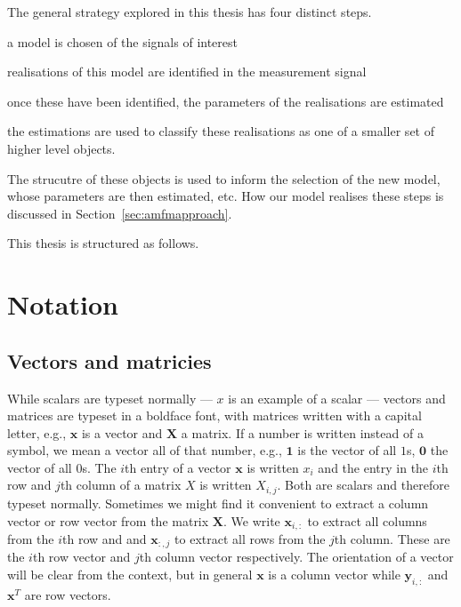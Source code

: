 The general strategy explored in this thesis has four distinct steps.
\begin{enumerate*}[itemjoin={{. }}]
\item a model is chosen of the signals of interest
\item realisations of this model are
identified in the measurement signal
\item once these have been identified, the parameters
of the realisations are estimated
\item the estimations are used to classify these
realisations as one of a smaller set of higher level objects.
\end{enumerate*}
The strucutre of these objects is used to inform the selection of the new model,
whose parameters are then estimated, etc. How our model realises these steps is
discussed in Section~\ref{sec:amfmapproach}.

This thesis is structured as follows.

\section{Notation}

\subsection{Vectors and matricies}

While scalars are typeset normally --- $x$ is an example of a scalar --- vectors
and matrices are typeset in a boldface font, with matrices written with a
capital letter, e.g., $\boldsymbol{x}$ is a vector and $\boldsymbol{X}$ a
matrix. If a number is written instead of a symbol, we mean a vector all of that
number, e.g., $\boldsymbol{1}$ is the vector of all $1$s, $\boldsymbol{0}$ the
vector of all $0$s. The $i$th entry of a vector $\boldsymbol{x}$ is written
$x_{i}$ and the entry in the $i$th row and $j$th column of a matrix $X$ is
written $X_{i,j}$.  Both are scalars and therefore typeset normally. Sometimes
we might find it convenient to extract a column vector or row vector from the
matrix $\boldsymbol{X}$. We write $\boldsymbol{x}_{i,:}$ to extract all columns
from the $i$th row and and $\boldsymbol{x}_{:,j}$ to extract all rows from the
$j$th column. These are the $i$th row vector and $j$th column vector
respectively. The orientation of a vector will be clear from the context, but in
general $\boldsymbol{x}$ is a column vector while $\boldsymbol{y}_{i,:}$ and
$\boldsymbol{x}^{T}$ are row vectors.

